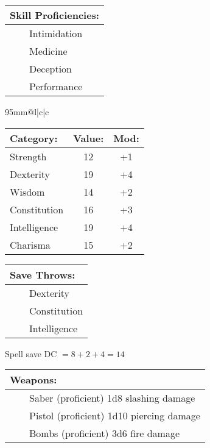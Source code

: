 \documentclass[11pt]{article}
\newcommand{\tabitem}{~~\llap{--}~~}
\begin{document}
\begin{multicols}{2}
\vspace{2mm}

\noindent \begin{tabularx}{95mm}{@{}l}
{\Large \textbf{Skill Proficiencies:}} \\
\hline
\tabitem Intimidation \\
\tabitem Medicine \\
\tabitem Deception \\
\tabitem Performance
		\end{tabularx}

\vspace{4mm}

\noindent \begin{tabularx}{95mm}{@{}l|c|c}
 \\
\hline
		\end{tabularx}
\noindent \begin{tabular}{@{}l|c|c}
\textbf{Category:} 			& \textbf{Value:} 	& \textbf{Mod:} \\
\hline
Strength 					& 12	 				& +1		\\
Dexterity 					& 19	 				& +4		\\
Wisdom 						& 14					& +2		\\
Constitution 				& 16	 				& +3		\\
Intelligence 				& 19	 				& +4		\\
Charisma 					& 15	 				& +2
		\end{tabular}

\vspace{4mm}

\noindent \begin{tabularx}{95mm}{@{}l}
{\Large \textbf{Save Throws:}} \\
\hline
\tabitem Dexterity \\
\tabitem Constitution \\
\tabitem Intelligence \\
		\end{tabularx}
\noindent Spell save DC $= 8 + 2 + 4 = 14$

\vspace{4mm}

\noindent \begin{tabularx}{95mm}{@{}l}
{\Large \textbf{Weapons:}} \\
\hline
\tabitem Saber (proficient) 1d8 slashing damage \\
\tabitem Pistol (proficient) 1d10 piercing damage \\
\tabitem Bombs (proficient) 3d6 fire damage
		\end{tabularx}


\end{multicols}
\end{document}
